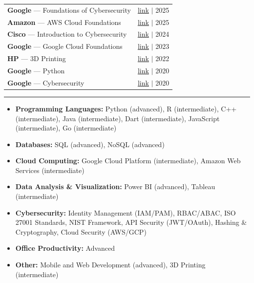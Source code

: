 \documentclass[11pt, a4paper]{article}
\begin{document}
\begin{tabularx}{\linewidth}{@{}X r@{}}
  \textbf{Google} --- Foundations of Cybersecurity & \href{https://drive.google.com/}{\textcolor{linkblue}{link}} $|$ 2025 \\
  \textbf{Amazon} --- AWS Cloud Foundations & \href{https://drive.google.com/}{\textcolor{linkblue}{link}} $|$ 2025 \\
  \textbf{Cisco} --- Introduction to Cybersecurity & \href{https://drive.google.com/}{\textcolor{linkblue}{link}} $|$ 2024 \\
  \textbf{Google} --- Google Cloud Foundations & \href{https://drive.google.com/}{\textcolor{linkblue}{link}} $|$ 2023 \\
  \textbf{HP} --- 3D Printing & \href{https://drive.google.com/}{\textcolor{linkblue}{link}} $|$ 2022 \\
  \textbf{Google} --- Python & \href{https://drive.google.com/}{\textcolor{linkblue}{link}} $|$ 2020 \\
  \textbf{Google} --- Cybersecurity & \href{https://drive.google.com/}{\textcolor{linkblue}{link}} $|$ 2020 \\
\end{tabularx}


\vspace{6pt}\vspace{2pt}\hrule\vspace{4pt}

\vspace{2pt}

\begin{itemize}[leftmargin=1.5em, itemsep=1pt, topsep=2pt]
  \item \textbf{Programming Languages:} Python (advanced), R (intermediate), C++ (intermediate), Java (intermediate), Dart (intermediate), JavaScript (intermediate), Go (intermediate)
  \item \textbf{Databases:} SQL (advanced), NoSQL (advanced)
  \item \textbf{Cloud Computing:} Google Cloud Platform (intermediate), Amazon Web Services (intermediate)
  \item \textbf{Data Analysis \& Visualization:} Power BI (advanced), Tableau (intermediate)
  \item \textbf{Cybersecurity:} Identity Management (IAM/PAM), RBAC/ABAC, ISO 27001 Standards, NIST Framework, API Security (JWT/OAuth), Hashing \& Cryptography, Cloud Security (AWS/GCP)
  \item \textbf{Office Productivity:} Advanced
  \item \textbf{Other:} Mobile and Web Development (advanced), 3D Printing (intermediate)
\end{itemize}
\end{document}
